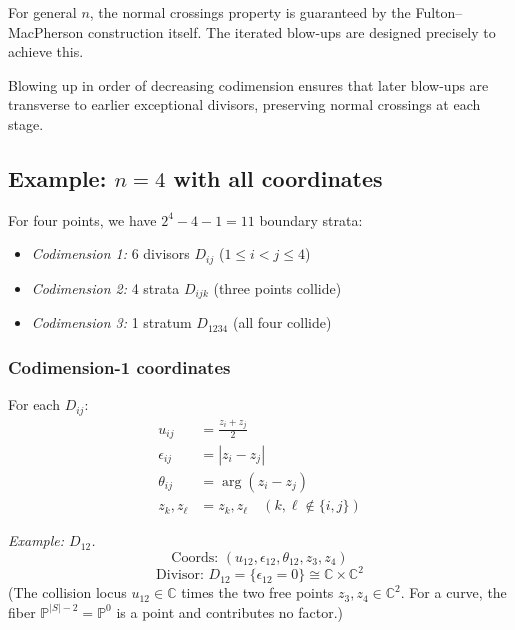 \begin{remark}
For general $n$, the normal crossings property is guaranteed by the Fulton--MacPherson
construction itself. The iterated blow-ups are designed precisely to achieve this.

Blowing up in order of decreasing codimension ensures that later blow-ups
are transverse to earlier exceptional divisors, preserving normal crossings at each stage.
\end{remark}

\subsection{\texorpdfstring{Example: $n=4$ with all coordinates}{Example: n=4 with all coordinates}}

\begin{example}\label{ex:coords-n4-complete}
For four points, we have $2^4 - 4 - 1 = 11$ boundary strata:
\begin{itemize}
\item \emph{Codimension 1:} 6 divisors $D_{ij}$ ($1 \leq i < j \leq 4$)
\item \emph{Codimension 2:} 4 strata $D_{ijk}$ (three points collide)
\item \emph{Codimension 3:} 1 stratum $D_{1234}$ (all four collide)
\end{itemize}

\subsubsection{Codimension-1 coordinates}

For each $D_{ij}$:
\begin{align}
u_{ij} &= \frac{z_i + z_j}{2}\\
\epsilon_{ij} &= |z_i - z_j|\\
\theta_{ij} &= \arg(z_i - z_j)\\
z_k, z_\ell &= z_k, z_\ell \quad (k, \ell \notin \{i,j\})
\end{align}

\emph{Example: $D_{12}$.}
\[\text{Coords: } (u_{12}, \epsilon_{12}, \theta_{12}, z_3, z_4)\]
\[\text{Divisor: } D_{12} = \{\epsilon_{12} = 0\} \cong \mathbb{C} \times \mathbb{C}^2\]
(The collision locus $u_{12} \in \mathbb{C}$ times the two free points $z_3, z_4 \in \mathbb{C}^2$.  For a curve, the fiber $\mathbb{P}^{|S|-2} = \mathbb{P}^0$ is a point and contributes no factor.)


\end{example}
